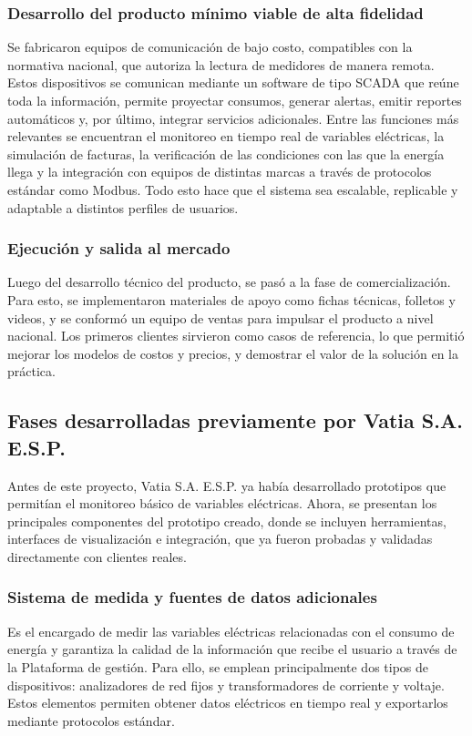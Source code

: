 \subsubsection{Desarrollo del producto mínimo viable de alta fidelidad}
Se fabricaron equipos de comunicación de bajo costo, compatibles con la normativa nacional, que autoriza la lectura de medidores de manera remota. Estos dispositivos se comunican mediante un software de tipo SCADA que reúne toda la información, permite proyectar consumos, generar alertas, emitir reportes automáticos y, por último, integrar servicios adicionales. Entre las funciones más relevantes se encuentran el monitoreo en tiempo real de variables eléctricas, la simulación de facturas, la verificación de las condiciones con las que la energía llega y la integración con equipos de distintas marcas a través de protocolos estándar como Modbus. Todo esto hace que el sistema sea escalable, replicable y adaptable a distintos perfiles de usuarios.

\subsubsection{Ejecución y salida al mercado}
Luego del desarrollo técnico del producto, se pasó a la fase de comercialización. Para esto, se implementaron materiales de apoyo como fichas técnicas, folletos y videos, y se conformó un equipo de ventas para impulsar el producto a nivel nacional. Los primeros clientes sirvieron como casos de referencia, lo que permitió mejorar los modelos de costos y precios, y demostrar el valor de la solución en la práctica.

\subsection{Fases desarrolladas previamente por Vatia S.A. E.S.P.}
Antes de este proyecto, Vatia S.A. E.S.P. ya había desarrollado prototipos que permitían el monitoreo básico de variables eléctricas. Ahora, se presentan los principales componentes del prototipo creado, donde se incluyen herramientas, interfaces de visualización e integración, que ya fueron probadas y validadas directamente con clientes reales.

\subsubsection{Sistema de medida y fuentes de datos adicionales}
Es el encargado de medir las variables eléctricas relacionadas con el consumo de energía y garantiza la calidad de la información que recibe el usuario a través de la Plataforma de gestión. Para ello, se emplean principalmente dos tipos de dispositivos: analizadores de red fijos y transformadores de corriente y voltaje. Estos elementos permiten obtener datos eléctricos en tiempo real y exportarlos mediante protocolos estándar.

